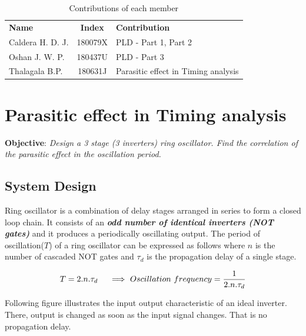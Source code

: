\documentclass[a4paper,11pt]{article}%
\begin{document}


\tableofcontents
\vspace{4cm}
\begin{table}[H]
		\centering
		\begin{tabular}{l c l}
		\textbf{Name} & \textbf{Index} & \textbf{Contribution}\\

	Caldera H. D. J. &  180079X& PLD - Part 1, Part 2\\
	Oshan J. W. P.    & 180437U& PLD - Part 3 \\
	Thalagala B.P. & 180631J & Parasitic effect in Timing analysis \\ 


		\end{tabular}
		\caption{Contributions of each member}
\end{table}




\pagebreak
\section{Parasitic effect in Timing analysis}
\textbf{Objective}: \textit{Design a 3 stage (3 inverters) ring oscillator. Find the correlation of the parasitic effect in the oscillation period.}\\

\subsection{System Design}
Ring oscillator is a combination of delay stages arranged in series to form a closed loop chain. It consists of an \textbf{\textit{odd number of identical inverters (NOT gates)}} and it produces a  periodically oscillating output. The period of oscillation($T$) of a ring oscillator can be expressed as follows where $n$ is the number of cascaded NOT gates and $\tau_{d}$ is the propagation delay of a single stage.

\[
T = 2.n.\tau_{d} \hspace{5mm}\Longrightarrow ~ Oscillation~frequency = \frac{1}{2.n.\tau_{d}}
\]
\vspace{5mm}

Following figure illustrates the input output characteristic of an ideal inverter. There, output is changed as soon as the input signal changes. That is no propagation delay.
\end{document}
